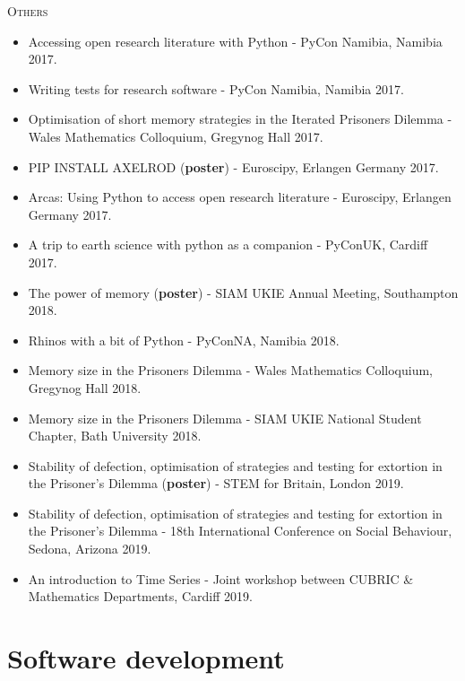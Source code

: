 \textsc{Others}
\begin{itemize}
\item Accessing open research literature with Python - PyCon Namibia, Namibia 2017.
\item Writing tests for research software - PyCon Namibia, Namibia 2017.
\item Optimisation of short memory strategies in the Iterated Prisoners Dilemma - Wales Mathematics Colloquium, Gregynog Hall 2017.
\item PIP INSTALL AXELROD (\textbf{poster}) - Euroscipy, Erlangen Germany 2017.
\item Arcas: Using Python to access open research literature - Euroscipy, Erlangen Germany 2017.
\item A trip to earth science with python as a companion - PyConUK, Cardiff 2017.
\item The power of memory (\textbf{poster}) - SIAM UKIE Annual Meeting, Southampton 2018.
\item Rhinos with a bit of Python - PyConNA, Namibia 2018.
\item Memory size in the Prisoners Dilemma - Wales Mathematics Colloquium, Gregynog Hall 2018.
\item Memory size in the Prisoners Dilemma - SIAM UKIE National Student Chapter, Bath University 2018.
\item Stability of defection, optimisation of strategies and testing for extortion in the Prisoner's Dilemma (\textbf{poster}) - STEM for Britain, London 2019.
\item Stability of defection, optimisation of strategies and testing for extortion in the Prisoner's Dilemma - 18th International Conference on Social Behaviour, Sedona, Arizona 2019.
\item An introduction to Time Series - Joint workshop between CUBRIC \& Mathematics Departments, Cardiff 2019.
\end{itemize}

\section*{Software development}

